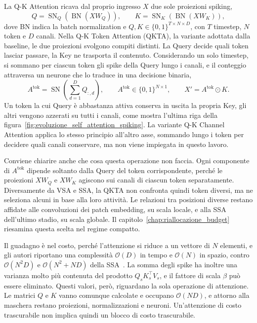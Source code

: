 La Q-K Attention ricava dal proprio ingresso $X$ due sole proiezioni spiking,
\begin{equation}
\label{eq:qk_projections_qkformer}
Q = \operatorname{SN}_{Q} \left( \operatorname{BN}(XW_Q) \right), \qquad K = \operatorname{SN}_{K} \left( \operatorname{BN}(XW_K) \right),
\end{equation}
dove BN indica la batch normalization e $Q,K\in\{0,1\}^{T\times N\times D}$, con $T$ timestep, $N$ token e $D$ canali. Nella Q-K Token Attention (QKTA), la variante adottata dalla baseline, le due proiezioni svolgono compiti distinti. La Query decide quali token lasciar passare, la Key ne trasporta il contenuto. Considerando un solo timestep, si sommano per ciascun token gli spike della Query lungo i canali, e il conteggio attraversa un neurone che lo traduce in una decisione binaria,
\begin{equation}
\label{eq:qkta_vettore_attenzione}
A^{\mathrm{tok}} = \operatorname{SN} \left( \sum_{d=1}^{D} Q_{:,d} \right), \qquad A^{\mathrm{tok}} \in \{0, 1\}^{N \times 1}, \qquad X' = A^{\mathrm{tok}} \odot K.
\end{equation}
Un token la cui Query è abbastanza attiva conserva in uscita la propria Key, gli altri vengono azzerati su tutti i canali, come mostra l'ultima riga della figura~\ref{fig:evoluzione_self_attention_spiking}. La variante Q-K Channel Attention applica lo stesso principio all'altro asse, sommando lungo i token per decidere quali canali conservare, ma non viene impiegata in questo lavoro.

Conviene chiarire anche che cosa questa operazione non faccia. Ogni componente di $A^{\mathrm{tok}}$ dipende soltanto dalla Query del token corrispondente, perché le proiezioni $XW_Q$ e $XW_K$ agiscono sui canali di ciascun token separatamente. Diversamente da VSA e SSA, la QKTA non confronta quindi token diversi, ma ne seleziona alcuni in base alla loro attività. Le relazioni tra posizioni diverse restano affidate alle convoluzioni dei patch embedding, su scala locale, e alla SSA dell'ultimo stadio, su scala globale. Il capitolo~\ref{chap:riallocazione_budget} riesamina questa scelta nel regime compatto.

Il guadagno è nel costo, perché l'attenzione si riduce a un vettore di $N$ elementi, e gli autori riportano una complessità $\mathcal{O}(D)$ in tempo e $\mathcal{O}(N)$ in spazio, contro $\mathcal{O}(N^2D)$ e $\mathcal{O}(N^2+ND)$ della SSA~\cite{zhou2024qkformer}. La somma degli spike ha inoltre una varianza molto più contenuta del prodotto $Q_sK_s^{\top}V_s$, e il fattore di scala $\beta$ può essere eliminato. Questi valori, però, riguardano la sola operazione di attenzione. Le matrici $Q$ e $K$ vanno comunque calcolate e occupano $\mathcal{O}(ND)$, e attorno alla maschera restano proiezioni, normalizzazioni e neuroni. Un'attenzione di costo trascurabile non implica quindi un blocco di costo trascurabile.

